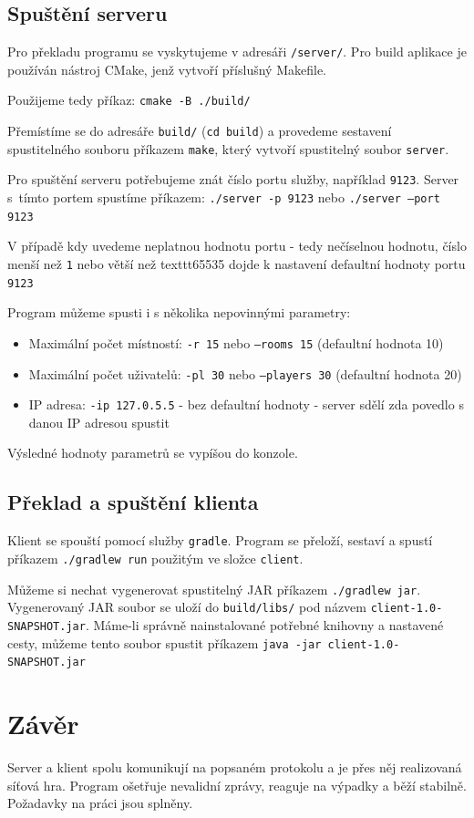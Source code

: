 \documentclass[12pt, a4paper]{article} %
\begin{document}
	\subsection{Spuštění serveru}
	\par Pro překladu programu se vyskytujeme v adresáři \texttt{/server/}. Pro build aplikace je používán nástroj CMake, jenž vytvoří příslušný Makefile.\\
	\par Použijeme tedy příkaz: \texttt{cmake -B ./build/}\\
	\par Přemístíme se do adresáře \texttt{build/} (\texttt{cd build}) a provedeme sestavení spustitelného souboru příkazem \texttt{make}, který vytvoří spustitelný soubor \texttt{server}.
	\par Pro spuštění serveru potřebujeme znát číslo portu služby, například \texttt{9123}. Server s tímto portem spustíme příkazem:
	\texttt{./server -p 9123} nebo \texttt{./server --port 9123}\\
	\par V případě kdy uvedeme neplatnou hodnotu portu - tedy nečíselnou hodnotu, číslo menší než \texttt{1} nebo větší než texttt{65535} dojde k nastavení defaultní hodnoty portu \texttt{9123}\\
	\par Program můžeme spusti i s několika nepovinnými parametry:
	\begin{itemize}
		\item Maximální počet místností: \texttt{-r 15} nebo \texttt{--rooms 15}  (defaultní hodnota 10)
		\item Maximální počet uživatelů: \texttt{-pl 30} nebo \texttt{--players 30} (defaultní hodnota 20)
		\item IP adresa: \texttt{-ip 127.0.5.5} - bez defaultní hodnoty - server sdělí zda povedlo s danou IP adresou spustit
	\end{itemize}
	\par Výsledné hodnoty parametrů se vypíšou do konzole.
	

	\subsection{Překlad a spuštění klienta}
	\par Klient se spouští pomocí služby \texttt{gradle}. Program se přeloží, sestaví a spustí příkazem \texttt{./gradlew run} použitým ve složce \texttt{client}.
	\par Můžeme si nechat vygenerovat spustitelný JAR příkazem \texttt{./gradlew jar}. Vygenerovaný JAR soubor se uloží do \texttt{build/libs/} pod názvem \texttt{client-1.0-SNAPSHOT.jar}. Máme-li správně nainstalované potřebné knihovny a nastavené cesty, můžeme tento soubor spustit příkazem \texttt{java -jar client-1.0-SNAPSHOT.jar}
	\section{Závěr}
	\par Server a klient spolu komunikují na popsaném protokolu a je přes něj realizovaná síťová hra. Program ošetřuje nevalidní zprávy, reaguje na výpadky a běží stabilně. Požadavky na práci jsou splněny.
	
\end{document}
